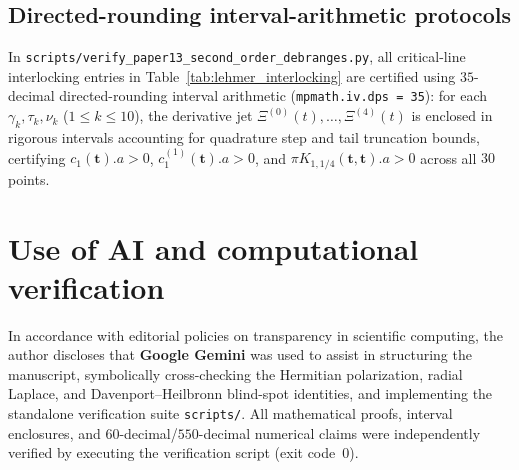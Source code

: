 \documentclass[11pt,reqno]{amsart}
\theoremstyle{definition}
\theoremstyle{remark}
\numberwithin{equation}{section}
\begin{document}
\subsection{Directed-rounding interval-arithmetic protocols}\label{app:interval}

In \texttt{scripts/}\allowbreak\texttt{verify\_paper13\_}\allowbreak\texttt{second\_order\_}\allowbreak\texttt{debranges.py}, all critical-line interlocking entries in Table~\ref{tab:lehmer_interlocking} are certified using $35$-decimal directed-rounding interval arithmetic (\texttt{mpmath.iv.dps = 35}): for each $\gamma_k, \tau_k, \nu_k$ ($1 \le k \le 10$), the derivative jet $\Xi^{(0)}(t), \dots, \Xi^{(4)}(t)$ is enclosed in rigorous intervals accounting for quadrature step and tail truncation bounds, certifying $c_1(\boldsymbol{t}).a > 0$, $c_1^{(1)}(\boldsymbol{t}).a > 0$, and $\pi K_{1,1/4}(\boldsymbol{t}, \boldsymbol{t}).a > 0$ across all $30$ points.

\section*{Use of AI and computational verification}

{\sloppy
In accordance with editorial policies on transparency in scientific computing, the author discloses that \textbf{Google Gemini} was used to assist in structuring the manuscript, symbolically cross-checking the Hermitian polarization, radial Laplace, and Davenport--Heilbronn blind-spot identities, and implementing the standalone verification suite \texttt{scripts/}\allowbreak\texttt{}. All mathematical proofs, interval enclosures, and $60$-decimal/$550$-decimal numerical claims were independently verified by executing the verification script (exit code~$0$).\par}
\end{document}
